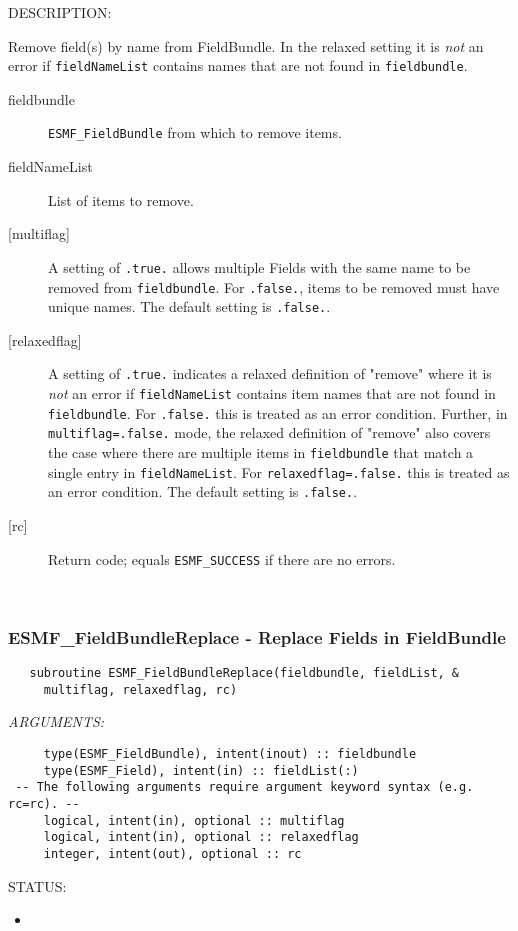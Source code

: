 {\sf DESCRIPTION:\\ }


   Remove field(s) by name from FieldBundle. In the relaxed setting it is
   {\em not} an error if {\tt fieldNameList} contains names that are not
   found in {\tt fieldbundle}.
  
   \begin{description}
   \item [fieldbundle]
   {\tt ESMF\_FieldBundle} from which to remove items.
   \item [fieldNameList]
   List of items to remove.
   \item [{[multiflag]}]
   A setting of {\tt .true.} allows multiple Fields with the same name
   to be removed from {\tt fieldbundle}. For {\tt .false.}, items to be
   removed must have unique names. The default setting is {\tt .false.}.
   \item [{[relaxedflag]}]
   A setting of {\tt .true.} indicates a relaxed definition of "remove"
   where it is {\em not} an error if {\tt fieldNameList} contains item
   names that are not found in {\tt fieldbundle}. For {\tt .false.} this is
   treated as an error condition.
   Further, in {\tt multiflag=.false.} mode, the relaxed definition of
   "remove" also covers the case where there are multiple items in
   {\tt fieldbundle} that match a single entry in {\tt fieldNameList}.
   For {\tt relaxedflag=.false.} this is treated as an error condition.
   The default setting is {\tt .false.}.
   \item [{[rc]}]
   Return code; equals {\tt ESMF\_SUCCESS} if there are no errors.
   \end{description}
   
 
\mbox{}\hrulefill\ 
 
\subsubsection [ESMF\_FieldBundleReplace] {ESMF\_FieldBundleReplace - Replace Fields in FieldBundle}


  
\begin{verbatim}   subroutine ESMF_FieldBundleReplace(fieldbundle, fieldList, &
     multiflag, relaxedflag, rc)\end{verbatim}{\em ARGUMENTS:}
\begin{verbatim}     type(ESMF_FieldBundle), intent(inout) :: fieldbundle
     type(ESMF_Field), intent(in) :: fieldList(:)
 -- The following arguments require argument keyword syntax (e.g. rc=rc). --
     logical, intent(in), optional :: multiflag
     logical, intent(in), optional :: relaxedflag
     integer, intent(out), optional :: rc\end{verbatim}
{\sf STATUS:}
   \begin{itemize}
   \item{}
   \end{itemize}
  
